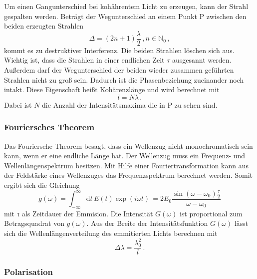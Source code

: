 Um einen Gangunterschied bei kohährentem Licht zu erzeugen, kann der Strahl gespalten werden.
Beträgt der Wegunterschied an einem Punkt P zwischen den beiden erzeugten Strahlen
\begin{equation*}
    Δ = \left(2n + 1\right)\frac{λ}{2}\, , n \in \mathbb{N}_0\, ,
\end{equation*}
kommt es zu destruktiver Interferenz. Die beiden Strahlen löschen sich aus.
Wichtig ist, dass die Strahlen in einer endlichen Zeit $τ$ ausgesannt werden.
Außerdem darf der Wegunterschied der beiden wieder zusammen geführten Strahlen nicht zu groß sein.
Dadurch ist die Phasenbeziehung zueinander noch intakt.
Diese Eigenschaft heißt Kohärenzlänge und wird berechnet mit
\begin{equation*}
    l = N λ\, .
\end{equation*}
Dabei ist $N$ die Anzahl der Intensitätsmaxima die in P zu sehen sind.
\subsubsection{Fouriersches Theorem} %
\label{sec:Fouriersches Theorem}

Das Fouriersche Theorem besagt, dass ein Wellenzug nicht monochromatisch sein kann, wenn er eine endliche Länge hat.
Der Wellenzug muss ein Frequenz- und Wellenlängenspektrum besitzen.
Mit Hilfe einer Fouriertransformation kann aus der Feldstärke eines Wellenzuges das Frequenzspektrum berechnet werden.
Somit ergibt sich die Gleichung
\begin{equation*}
    g\left(ω\right) = \int_{-\infty}^{\infty}\text{d}t\, E\left(t\right) \exp{\left(iωt\right)}\,
    = 2 E_0 \frac{\sin{(ω - ω_0)}\frac{τ}{2}}{ω - ω_0}
\end{equation*}
mit τ als Zeitdauer der Emmision.
Die Intensität $G(ω)$ ist proportional zum Betragsquadrat von $g(ω)$.
Aus der Breite der Intensitätsfunktion $G(ω)$ lässt sich die Wellenlängenverteilung des emmitierten Lichts berechnen mit
\begin{equation*}
    Δλ = \frac{λ_0^2}{l}\, .
\end{equation*}

\subsubsection{Polarisation}
\label{sec:Polarisation}

